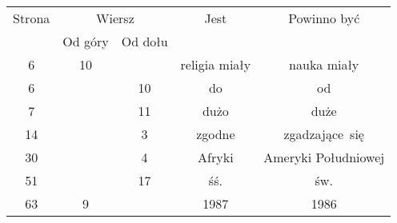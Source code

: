 \documentclass[a4paper,11pt]{article}
\begin{document}
\vspace{\spaceTwo}




\vspace{0em}




\begin{center}

  \begin{tabular}{|c|c|c|c|c|}
    \hline
    Strona & \multicolumn{2}{c|}{Wiersz} & Jest
                              & Powinno być \\ \cline{2-3}
    & Od góry & Od dołu & & \\
    \hline
    \hphantom{0}6 & 10 & & religia miały & nauka miały \\
    \hphantom{0}6 & & 10 & do & od \\
    \hphantom{0}7 & & 11 & dużo & duże \\
    14 & & \hphantom{0}3 & zgodne & zgadzające~się \\
    30 & & \hphantom{0}4 & Afryki & Ameryki Południowej \\
    51 & & 17 & śś. & św. \\
    63 & \hphantom{0}9 & & 1987 & 1986 \\
    \hline
  \end{tabular}

\end{center}













\end{document}
